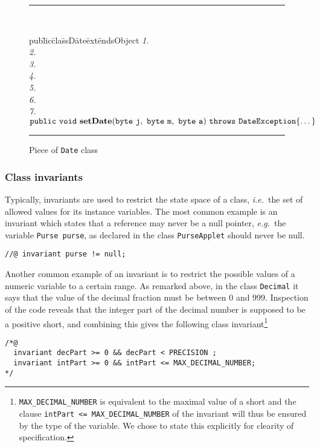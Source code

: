 \documentclass[a4paper]{llncs}
\begin{document}
\begin{center}
\begin{figure}[hbt]
\rule{\linewidth}{0.3mm}
\\[2.0ex]
\begin{tabbing}
pub\=lic\=cla\=ssD\=ate\=ext\=endsObject  \kill
\emph{1. } \\ 
\emph{2. }\> \\
\emph{3. }\> \\
\emph{4. }\> \\
\emph{5. }\> \\
\emph{6. }\>\\
\emph{7. }\>{\it */} \\
\>$\mathtt{public\ void\ {\bf setDate}(byte\ j,\ byte\ m,\ byte\ a)\
throws\ DateException\{ \dots \}}$ 
\end{tabbing}
\caption{Piece of {\tt Date} class}
\label{fig-cla-dat}
\rule{\linewidth}{0.3mm}
\end{figure}
\end{center}






\subsubsection{Class invariants}
Typically, invariants are used to restrict the state space of a class,
\emph{i.e.}~the set of allowed values for its instance variables. The
most common example is an invariant which states that a reference may
never be a null pointer, \emph{e.g.}~the variable
\texttt{Purse purse}, as declared in the class \texttt{PurseApplet}
should never be null.
\begin{verbatim}
//@ invariant purse != null;
\end{verbatim}
Another common example of an invariant is to restrict the possible
values of a numeric variable to a certain range. As remarked above, in
the class \texttt{Decimal} it says that the value of the decimal
fraction must be between 0 and 999. Inspection of the code reveals 
that the integer part of the decimal number is supposed to be a
positive short, and combining this gives the following class
invariant\footnote{\texttt{MAX\_DECIMAL\_NUMBER} is equivalent to the
maximal value of a short and the clause \texttt{intPart <=
MAX\_DECIMAL\_NUMBER} of the invariant will thus be
ensured by the type of the variable. We chose to state this explicitly
for clearity of specification.}
\begin{verbatim}
/*@
  invariant decPart >= 0 && decPart < PRECISION ;
  invariant intPart >= 0 && intPart <= MAX_DECIMAL_NUMBER;
*/
\end{verbatim}
\end{document}
